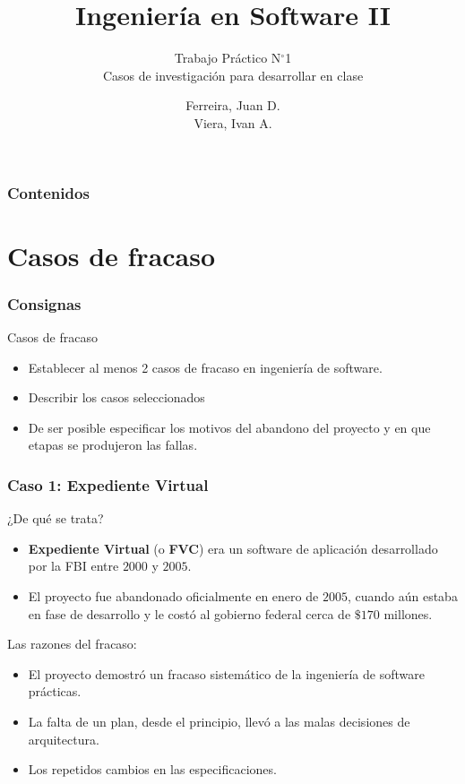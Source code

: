 \documentclass[11pt]{beamer}
\title{Ingeniería en Software II}
\subtitle[Ed/Ing]{Trabajo Práctico N$^{\circ}$1\\ 
	Casos de investigación para desarrollar en clase}
\author{Ferreira, Juan D.\\ %
	    Viera, Ivan A.      %
}
\begin{document}
	\begin{frame} %
		\titlepage
	\end{frame}

	\begin{frame}
		\frametitle{Contenidos}
		\tableofcontents[pausesections]
	\end{frame}

	\section[Casos de fracaso]{Casos de fracaso}
	\begin{frame}
		\frametitle{Consignas}
		\begin{block}{Casos de fracaso}
			\begin{itemize}
				\item Establecer al menos 2 casos de fracaso en ingeniería de software.
				\item Describir los casos seleccionados
				\item De ser posible especificar los motivos del abandono del proyecto y en que etapas se produjeron
				las fallas.
			\end{itemize}
		\end{block}
	\end{frame}

	\begin{frame}
		\frametitle{Caso 1: Expediente Virtual}
		\begin{block}{¿De qué se trata?}
			\begin{itemize}
				\item \textbf{Expediente Virtual} (o \textbf{FVC}) era un software de aplicación desarrollado por la FBI entre $2000$ y $2005$.
				\item El proyecto fue abandonado oficialmente en enero de $2005$, cuando aún estaba en fase de desarrollo y le costó al gobierno federal cerca de $\$170$ millones.
			\end{itemize}
		\end{block}
		\pause
		\begin{block}{Las razones del fracaso:}
			\begin{itemize}
				\item El proyecto demostró un fracaso sistemático de la ingeniería de software prácticas.
				\item La falta de un plan, desde el principio, llevó a las malas decisiones de arquitectura.
				\item Los repetidos cambios en las especificaciones.
			\end{itemize}
		\end{block}
	\end{frame}
\end{document}
